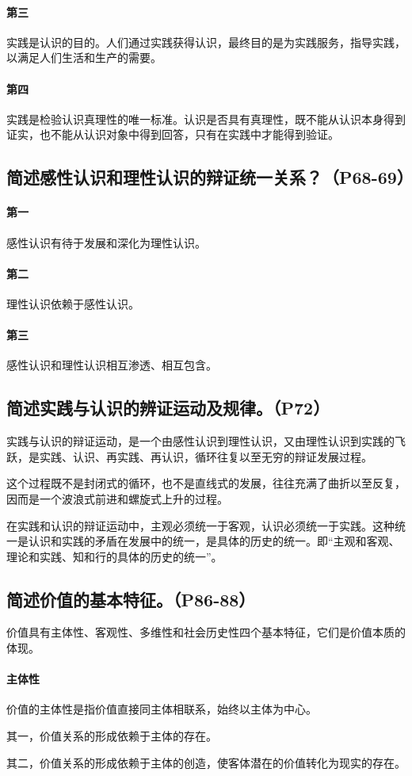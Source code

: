 \documentclass[UTF8]{ctexart}
\begin{document}
			\paragraph{第三}
				实践是认识的目的。人们通过实践获得认识，最终目的是为实践服务，指导实践，以满足人们生活和生产的需要。
			\paragraph{第四}
				实践是检验认识真理性的唯一标准。认识是否具有真理性，既不能从认识本身得到证实，也不能从认识对象中得到回答，只有在实践中才能得到验证。
		\subsection{简述感性认识和理性认识的辩证统一关系？（P68-69）}
			\paragraph{第一}
				感性认识有待于发展和深化为理性认识。
			\paragraph{第二}
				理性认识依赖于感性认识。
			\paragraph{第三}
				感性认识和理性认识相互渗透、相互包含。
		\subsection{简述实践与认识的辨证运动及规律。（P72）}
			实践与认识的辩证运动，是一个由感性认识到理性认识，又由理性认识到实践的飞跃，是实践、认识、再实践、再认识，循环往复以至无穷的辩证发展过程。\par
			这个过程既不是封闭式的循环，也不是直线式的发展，往往充满了曲折以至反复，因而是一个波浪式前进和螺旋式上升的过程。\par
			在实践和认识的辩证运动中，主观必须统一于客观，认识必须统一于实践。这种统一是认识和实践的矛盾在发展中的统一，是具体的历史的统一。即“主观和客观、理论和实践、知和行的具体的历史的统一”。
		\subsection{简述价值的基本特征。（P86-88）}
			价值具有主体性、客观性、多维性和社会历史性四个基本特征，它们是价值本质的体现。
			\paragraph{主体性}
				价值的主体性是指价值直接同主体相联系，始终以主体为中心。\par
				其一，价值关系的形成依赖于主体的存在。\par
				其二，价值关系的形成依赖于主体的创造，使客体潜在的价值转化为现实的存在。
\end{document}
